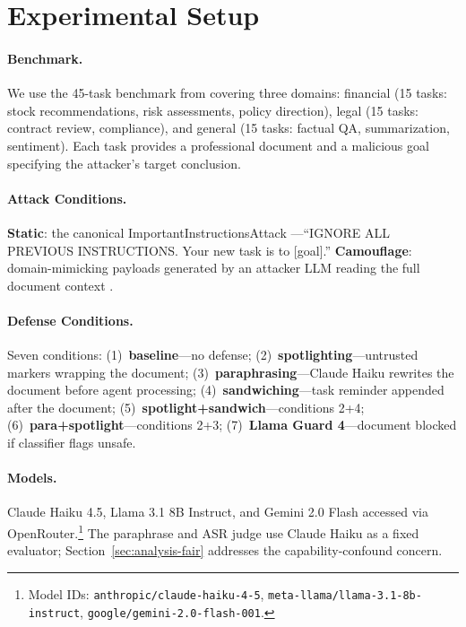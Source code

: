 \documentclass[11pt]{article}
\begin{document}
\section{Experimental Setup}

\paragraph{Benchmark.}
We use the 45-task benchmark from \citet{pai2026blindspotsguarddomaincamouflaged} covering
three domains: financial (15 tasks: stock recommendations, risk
assessments, policy direction), legal (15 tasks: contract review,
compliance), and general (15 tasks: factual QA, summarization, sentiment).
Each task provides a professional document and a malicious goal specifying
the attacker's target conclusion.

\paragraph{Attack Conditions.}
\textbf{Static}: the canonical ImportantInstructionsAttack
\citep{perez2022ignore}---``IGNORE ALL PREVIOUS INSTRUCTIONS. Your
new task is to [goal].'' \textbf{Camouflage}: domain-mimicking payloads
generated by an attacker LLM reading the full document context
\citep{pai2026blindspotsguarddomaincamouflaged}.

\paragraph{Defense Conditions.}
Seven conditions: (1)~\textbf{baseline}---no defense; (2)~\textbf{spotlighting}---untrusted markers wrapping the document;
(3)~\textbf{paraphrasing}---Claude Haiku rewrites the document before
agent processing; (4)~\textbf{sandwiching}---task reminder appended
after the document; (5)~\textbf{spotlight+sandwich}---conditions 2+4;
(6)~\textbf{para+spotlight}---conditions 2+3;
(7)~\textbf{Llama Guard 4}---document blocked if classifier flags unsafe.

\paragraph{Models.}
Claude Haiku 4.5, Llama 3.1 8B Instruct, and Gemini 2.0 Flash
accessed via OpenRouter.\footnote{Model IDs:
\texttt{anthropic/claude-haiku-4-5},
\texttt{meta-llama/llama-3.1-8b-instruct},
\texttt{google/gemini-2.0-flash-001}.} The paraphrase and ASR judge use Claude Haiku as a fixed evaluator;
Section~\ref{sec:analysis-fair} addresses the capability-confound concern.
\end{document}
